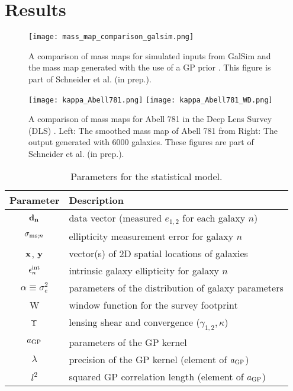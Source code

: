 \section{Results}
 \begin{figure}
	\centering
	\texttt{[image: mass\_map\_comparison\_galsim.png]}
	\caption{A comparison of mass maps for simulated inputs from {\sc GalSim} and
	the mass map generated with the use of a GP prior \label{fig:simplified_pgm}. 
	This figure is part of Schneider et al. (in prep.).
}
\end{figure}
 \begin{figure}
	\centering
	\texttt{[image: kappa\_Abell781.png]}
	\texttt{[image: kappa\_Abell781\_WD.png]}
	\caption{A comparison of mass maps for Abell 781 in the Deep Lens Survey (DLS) 
		\label{fig:simplified_pgm}.  Left: The smoothed mass map of Abell 781 from 
		Right: The output generated with 6000
		galaxies. 
	These figures are part of Schneider et al. (in prep.).
}
\end{figure}



\begin{table}%
\begin{center}
\caption{Parameters for the statistical model.}
\label{tab:sampling_parameters}
\begin{tabular}{cl}
\hline
Parameter & Description \\
\hline
${\bf d_{n}}$ & data vector (measured $e_{1,2}$ for each galaxy $n$)  \\
$\sigma_{{\rm ms}; n}$ & ellipticity measurement error for galaxy $n$ 
\\
$\mathbf{x}$, $\mathbf{y}$ & vector(s) of 2D spatial locations of galaxies \\
$\epsilon_n^{\rm int}$ & intrinsic galaxy ellipticity for galaxy $n$ \\
$\alpha\equiv\sigma_{e}^2$ & parameters of the distribution of galaxy parameters \\
W & window function for the survey footprint \\
$\Upsilon$ & lensing shear and convergence ($\gamma_{1,2}, \kappa$) \\
$a_{\rm GP}$ & parameters of the GP kernel\\
$\lambda$ & precision of the GP kernel (element of $a_{\rm GP}$) \\
$l^2$ & squared GP correlation length (element of $a_{\rm GP}$) \\
\hline
\end{tabular}
\end{center}
\end{table}



